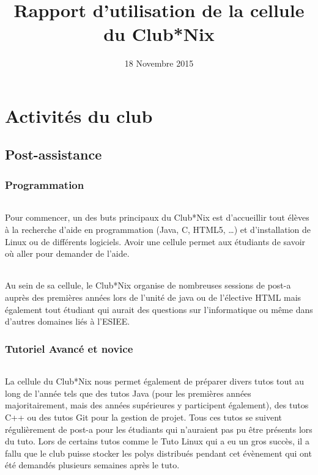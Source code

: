 \documentclass[11pt]{report}
\title{Rapport d'utilisation de la cellule du Club*Nix}
\date{18 Novembre 2015}
\begin{document}
\maketitle

\tableofcontents

\part{Activités du club}

\chapter{Post-assistance}

\section{Programmation}
\paragraph{} Pour commencer, un des buts principaux du Club*Nix est
d'accueillir tout élèves à la recherche d'aide en programmation (Java, C, HTML5,
\ldots) et d'installation de Linux ou de différents logiciels. Avoir une cellule
permet aux étudiants de savoir où aller pour demander de l'aide.

\paragraph{} Au sein de sa cellule, le Club*Nix organise de nombreuses sessions
de post-a auprès des premières années lors de l'unité de java ou de l'élective
HTML mais également tout étudiant qui aurait des questions sur l'informatique
ou même dans d'autres domaines liés à l'ESIEE.  

\section{Tutoriel Avancé et novice}
\paragraph{} La cellule du Club*Nix nous permet également de préparer divers
tutos tout au long de l'année tels que des tutos Java (pour les premières
années majoritairement, mais des années supérieures y participent également),
des tutos C++ ou des tutos Git pour la gestion de projet. Tous ces tutos se
suivent régulièrement de post-a pour les étudiants qui n'auraient pas pu être
présents lors du tuto. Lors de certains tutos comme le Tuto Linux qui a eu un
gros succès, il a fallu que le club puisse stocker les polys distribués pendant
cet évènement qui ont été demandés plusieurs semaines après le tuto.
\end{document}
